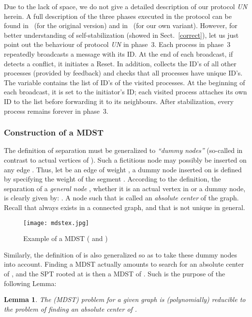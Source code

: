 \documentclass[10pt]{article}
\newtheorem{lemm}{Lemma}[section]
\begin{document}
Due to the lack of space, we do not give a detailed description of our
protocol {\em UN} herein. A full description of the three phases executed
in the protocol
can be found in~\cite{AnEH92} (for the original version) and in~\cite{BuBL95}
(for our own variant). However, for better understanding of self-stabilization
(showed in Sect.~\ref{correct}), let us just point out the behaviour of
protocol {\em UN}
in phase~3. Each process in phase~3 repeatedly broadcasts a message
with its ID. At the end of each broadcast, if  detects a conflict, it
initiates a Reset. In addition,  collects the ID's of all other processes
(provided by feedback) and checks that all processes have unique ID's.
The variable  contains the list of ID's of the visited processes.
At the beginning of each broadcast, it is set to the initiator's ID;
each visited process attaches its own ID to the list before forwarding it
to its neighbours.
After stabilization, every process remains forever in phase~3.

\subsubsection{Construction of a MDST} \label{mdst}
The definition of separation must be generalized to {\em ``dummy nodes''}
(so-called in contrast to actual vertices of ). Such a fictitious
node may possibly be inserted on any edge . Thus, let 
be an edge of weight , a dummy node  inserted on
 is defined by specifying the weight  of the segment
.  According to the definition, the separation  of
a {\em general node} , whether it is an actual vertex in  or a
dummy node, is clearly given by: .
A node  such that  is
called an {\it absolute center} of the graph. Recall that 
always exists in a connected graph, and that is not unique in general.

\begin{figure}[hbt]
\centering
\texttt{[image: mdstex.jpg]}
\caption{Example of a MDST  ( and )}
\label{fig:mdst}
\end{figure}

Similarly, the definition of  is also generalized so as to
take these dummy nodes into account. Finding a MDST actually amounts
to search for an absolute center  of , and the SPT rooted
at  is then a MDST of . Such is the purpose of the
following Lemma:

\begin{lemm}\label{lem:abscenter} {\rm \cite{CaGM80}}
The (MDST) problem for a given graph  is (polynomially) reducible to
the problem of finding an absolute center of .
\end{lemm}
\end{document}
